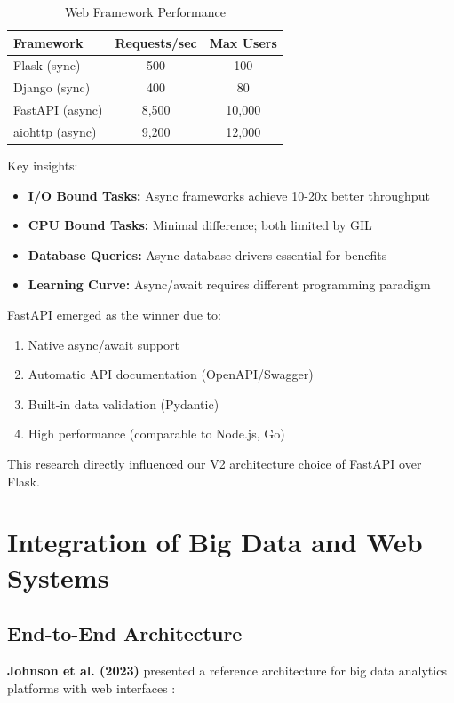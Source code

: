 \documentclass[conference]{IEEEtran}
\begin{document}
\begin{table}[h]
\centering
\caption{Web Framework Performance}
\begin{tabular}{|l|c|c|}
\hline
\textbf{Framework} & \textbf{Requests/sec} & \textbf{Max Users} \\
\hline
Flask (sync) & 500 & 100 \\
Django (sync) & 400 & 80 \\
FastAPI (async) & 8,500 & 10,000 \\
aiohttp (async) & 9,200 & 12,000 \\
\hline
\end{tabular}
\end{table}

Key insights:
\begin{itemize}
    \item \textbf{I/O Bound Tasks:} Async frameworks achieve 10-20x better throughput
    \item \textbf{CPU Bound Tasks:} Minimal difference; both limited by GIL
    \item \textbf{Database Queries:} Async database drivers essential for benefits
    \item \textbf{Learning Curve:} Async/await requires different programming paradigm
\end{itemize}

FastAPI emerged as the winner due to:
\begin{enumerate}
    \item Native async/await support
    \item Automatic API documentation (OpenAPI/Swagger)
    \item Built-in data validation (Pydantic)
    \item High performance (comparable to Node.js, Go)
\end{enumerate}

This research directly influenced our V2 architecture choice of FastAPI over Flask.

\section{Integration of Big Data and Web Systems}

\subsection{End-to-End Architecture}

\textbf{Johnson et al. (2023)} presented a reference architecture for big data analytics platforms with web interfaces \cite{johnson2023architecture}:
\end{document}
